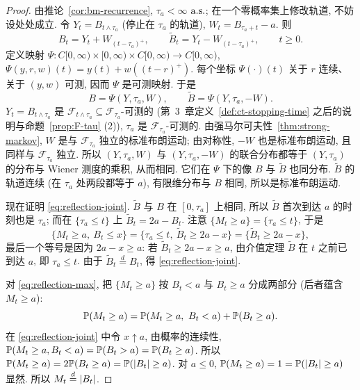 \begin{proof}
由推论~\ref{cor:bm-recurrence}, $\tau_a<\infty$ $\as$; 在一个零概率集上修改轨道, 不妨设处处成立. 令 $Y_t=B_{t\wedge\tau_a}$ (停止在 $\tau_a$ 的轨道), $W_t=B_{\tau_a+t}-a$. 则
\[
B_t=Y_t+W_{(t-\tau_a)^+},\qquad \widetilde{B}_t=Y_t-W_{(t-\tau_a)^+},\qquad t\ge0.
\]
定义映射 $\Psi: C[0,\infty)\times[0,\infty)\times C[0,\infty)\to C[0,\infty)$, $\Psi(y,r,w)(t)=y(t)+w((t-r)^+)$. 每个坐标 $\Psi(\cdot)(t)$ 关于 $r$ 连续、关于 $(y,w)$ 可测, 因而 $\Psi$ 是可测映射. 于是
\[
B=\Psi(Y,\tau_a,W),\qquad\widetilde{B}=\Psi(Y,\tau_a,-W).
\]
$Y_t=B_{t\wedge\tau_a}$ 是 $\mathcal{F}_{t\wedge\tau_a}\subseteq\mathcal{F}_{\tau_a}$-可测的 (第~3~章定义~\ref{def:ct-stopping-time} 之后的说明与命题~\ref{prop:F-tau} (2)), $\tau_a$ 是 $\mathcal{F}_{\tau_a}$-可测的. 由强马尔可夫性~\ref{thm:strong-markov}, $W$ 是与 $\mathcal{F}_{\tau_a}$ 独立的标准布朗运动; 由对称性, $-W$ 也是标准布朗运动, 且同样与 $\mathcal{F}_{\tau_a}$ 独立. 所以 $(Y,\tau_a,W)$ 与 $(Y,\tau_a,-W)$ 的联合分布都等于 $(Y,\tau_a)$ 的分布与 Wiener 测度的乘积, 从而相同. 它们在 $\Psi$ 下的像 $B$ 与 $\widetilde{B}$ 也同分布. $\widetilde{B}$ 的轨道连续 (在 $\tau_a$ 处两段都等于 $a$), 有限维分布与 $B$ 相同, 所以是标准布朗运动.

现在证明 \eqref{eq:reflection-joint}. $\widetilde{B}$ 与 $B$ 在 $[0,\tau_a]$ 上相同, 所以 $\widetilde{B}$ 首次到达 $a$ 的时刻也是 $\tau_a$; 而在 $\{\tau_a\le t\}$ 上 $\widetilde{B}_t=2a-B_t$. 注意 $\{M_t\ge a\}=\{\tau_a\le t\}$, 于是
\[
\big\{M_t\ge a,\ B_t\le x\big\}=\big\{\tau_a\le t,\ \widetilde{B}_t\ge2a-x\big\}=\big\{\widetilde{B}_t\ge2a-x\big\},
\]
最后一个等号是因为 $2a-x\ge a$: 若 $\widetilde{B}_t\ge2a-x\ge a$, 由介值定理 $\widetilde{B}$ 在 $t$ 之前已到达 $a$, 即 $\tau_a\le t$. 由于 $\widetilde{B}_t\overset{d}{=}B_t$, 得 \eqref{eq:reflection-joint}.

对 \eqref{eq:reflection-max}, 把 $\{M_t\ge a\}$ 按 $B_t<a$ 与 $B_t\ge a$ 分成两部分 (后者蕴含 $M_t\ge a$):
\[
\P(M_t\ge a)=\P(M_t\ge a,\ B_t<a)+\P(B_t\ge a).
\]
在 \eqref{eq:reflection-joint} 中令 $x\uparrow a$, 由概率的连续性, $\P(M_t\ge a,B_t<a)=\P(B_t>a)=\P(B_t\ge a)$. 所以 $\P(M_t\ge a)=2\P(B_t\ge a)=\P(\abs{B_t}\ge a)$. 对 $a\le0$, $\P(M_t\ge a)=1=\P(\abs{B_t}\ge a)$ 显然. 所以 $M_t\overset{d}{=}\abs{B_t}$.
\end{proof}

